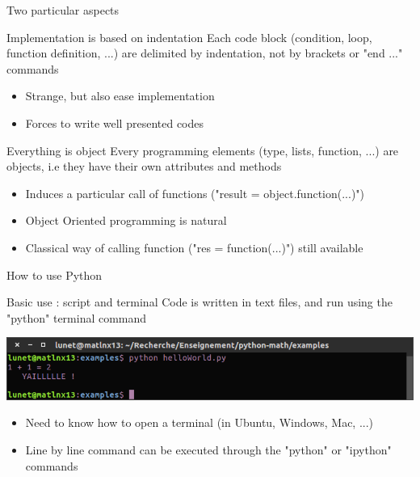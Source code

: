 \documentclass[11pt,unknownkeysallowed,usenames,dvipsnames]{beamer}
\begin{document}
\begin{frame}{Two particular aspects}
\vspace*{5pt}
\begin{block}{Implementation is based on indentation}
	Each code block (condition, loop, function definition, ...) 
	are delimited by indentation, not by brackets or "end ..." commands
	\begin{itemize}
		\item Strange, but also ease implementation
		\item Forces to write well presented codes
	\end{itemize}
\end{block}
\vspace*{5pt}
\begin{block}{Everything is object}
	Every programming elements (type, lists, function, ...) are objects, 
	i.e they have their own attributes and methods
	\begin{itemize}
		\item Induces a particular call of functions ("result = object.function(...)")
		\item Object Oriented programming is natural
		\item Classical way of calling function ("res = function(...)") still available
	\end{itemize}
\end{block}
\end{frame}

\begin{frame}{How to use Python}
    \vspace{5pt}
    \begin{block}{Basic use : script and terminal}
    Code is written in text files, and run using the "python" terminal command
    \begin{center}
    	\includegraphics[width=0.95\linewidth]{python-script}
    \end{center}
	\begin{itemize}
		\item Need to know how to open a terminal 
		(in Ubuntu, Windows, Mac, ...)
		\item Line by line command can be executed through the "python" or "ipython" commands
	\end{itemize} 
    \end{block}
\end{frame}
\end{document}
